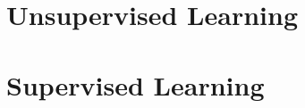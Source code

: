 
\section{Unsupervised Learning}
\label{ml:unsupervised}






\section{Supervised Learning}
\label{ml:supervised}


